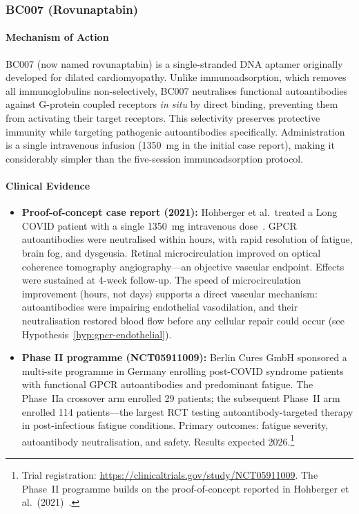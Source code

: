 \subsubsection{BC007 (Rovunaptabin)}
\label{sec:bc007}

\paragraph{Mechanism of Action}
BC007 (now named rovunaptabin) is a single-stranded DNA aptamer originally developed for dilated cardiomyopathy. Unlike immunoadsorption, which removes all immunoglobulins non-selectively, BC007 neutralises functional autoantibodies against G-protein coupled receptors \textit{in situ} by direct binding, preventing them from activating their target receptors. This selectivity preserves protective immunity while targeting pathogenic autoantibodies specifically. Administration is a single intravenous infusion (1350~mg in the initial case report), making it considerably simpler than the five-session immunoadsorption protocol.

\paragraph{Clinical Evidence}

\begin{itemize}
    \item \textbf{Proof-of-concept case report (2021):} Hohberger et al.\ treated a Long COVID patient with a single 1350~mg intravenous dose~\cite{Hohberger2021bc007}. GPCR autoantibodies were neutralised within hours, with rapid resolution of fatigue, brain fog, and dysgeusia. Retinal microcirculation improved on optical coherence tomography angiography---an objective vascular endpoint. Effects were sustained at 4-week follow-up. The speed of microcirculation improvement (hours, not days) supports a direct vascular mechanism: autoantibodies were impairing endothelial vasodilation, and their neutralisation restored blood flow before any cellular repair could occur (see Hypothesis~\ref{hyp:gpcr-endothelial}).

    \item \textbf{Phase II programme (NCT05911009):} Berlin Cures GmbH sponsored a multi-site programme in Germany enrolling post-COVID syndrome patients with functional GPCR autoantibodies and predominant fatigue. The Phase~IIa crossover arm enrolled 29 patients; the subsequent Phase~II arm enrolled 114 patients---the largest RCT testing autoantibody-targeted therapy in post-infectious fatigue conditions. Primary outcomes: fatigue severity, autoantibody neutralisation, and safety. Results expected 2026.\footnote{Trial registration: \url{https://clinicaltrials.gov/study/NCT05911009}. The Phase~II programme builds on the proof-of-concept reported in Hohberger et al.\ (2021)~\cite{Hohberger2021bc007}.}
\end{itemize}

